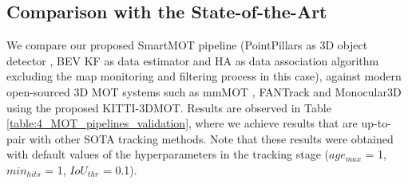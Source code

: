 \subsection{Comparison with the State-of-the-Art}
\label{subsec:4_mot_leaderboard}

We compare our proposed SmartMOT pipeline (PointPillars as 3D object detector \cite{lang2019pointpillars}, \ac{BEV} \ac{KF} as data estimator and \ac{HA} as data association algorithm excluding the map monitoring and filtering process in this case), against modern open-sourced 3D MOT systems such as mmMOT \cite{zhang2019robust}, FANTrack \cite{baser2019fantrack} and Monocular3D \cite{weng2019monocular} using the proposed KITTI-3DMOT. Results are observed in Table \ref{table:4_MOT_pipelines_validation}, where we achieve results that are up-to-pair with other \ac{SOTA} tracking methods. Note that these results were obtained with default values of the hyperparameters in the tracking stage ($age_{max}$ = 1, $min_{hits}$ = 1, $IoU_{thr}$ = 0.1). 

\begin{table}[h]
	\captionsetup{justification=justified}
	\caption[Comparative of Multi-Object Tracking pipelines using the KITTI-3DMOT evaluation tool in the validation set (car class)]{Comparative of Multi-Object Tracking pipelines using the KITTI-3DMOT evaluation tool in the validation set (car class). We bold the best results in \textbf{black} and the second best in  for each metric.}
	\label{table:4_MOT_pipelines_validation}
	\centering
\end{table}

